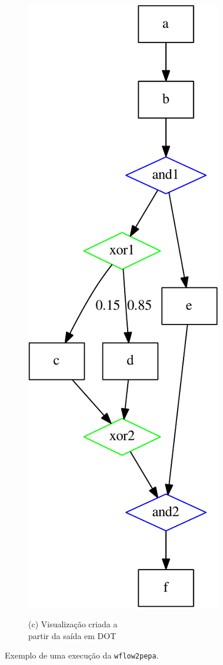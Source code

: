 \documentclass[a4paper,10pt]{article}
\begin{document}
\begin{figure}[h]
\begin{subfigure}[b]{0.6\textwidth}
        \end{subfigure}%
        ~~%
        \begin{subfigure}[b]{0.4\textwidth}
		        \centering
                \includegraphics[scale=0.55]{example-crop.pdf}

                (c) Visualização criada a \\ partir da saída em DOT
                \label{fig:tiger}
        \end{subfigure}
        \caption{Exemplo de uma execução da \texttt{wflow2pepa}.}
        \label{fig:exemplo}
\end{figure}\\
\end{document}
